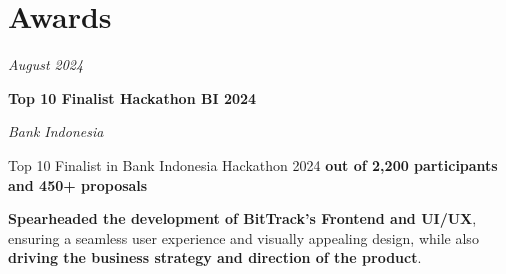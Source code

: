 \documentclass[../main.tex]{subfiles}
\begin{document}
     \section{Awards}

        \begin{twocolentry}{
            \small
        \textit{August 2024}}

            \textbf{Top 10 Finalist Hackathon BI 2024}

            \textit{Bank Indonesia}

        \end{twocolentry}
        \vspace{0.10 cm}
        \begin{onecolentry}
            \begin{highlights}
            \item Top 10 Finalist in Bank Indonesia Hackathon 2024 \textbf{out of 2,200 participants and 450+ proposals} 
            \item \textbf{Spearheaded the development of BitTrack's Frontend and UI/UX}, ensuring a seamless user experience and visually appealing design, while also \textbf{driving the business strategy and direction of the product}.
            \end{highlights}
        \end{onecolentry}
\end{document}
